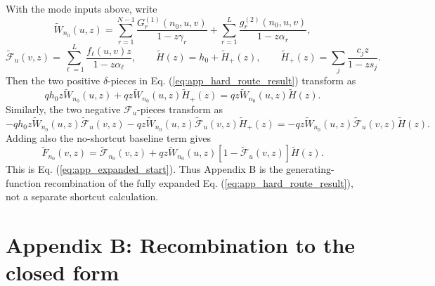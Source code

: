 \documentclass[superscriptaddress, amsmath, amssymb, aps, pre, floatfix]{revtex4-2}
\begin{document}
With the mode inputs above, write
\[
  \widetilde W_{n_0}(u,z)
  =
  \sum_{r=1}^{N-1}\frac{G^{(1)}_r(n_0,u,v)}{1-z\gamma_r}
  +
  \sum_{r=1}^{L}\frac{g^{(2)}_r(n_0,u,v)}{1-z\alpha_r},
\]
\[
  \widetilde{\mathcal F}_{u}(v,z)
  =
  \sum_{\ell=1}^{L}\frac{f_\ell(u,v)z}{1-z\alpha_\ell},
  \qquad
  \widetilde H(z)
  =
  h_0+\widetilde H_+(z),
  \qquad
  \widetilde H_+(z)=\sum_j\frac{c_jz}{1-zs_j}.
\]
Then the two positive \(\delta\)-pieces in Eq. (\ref{eq:app_hard_route_result}) transform as
\[
  qh_0z\widetilde W_{n_0}(u,z)
  +
  qz\widetilde W_{n_0}(u,z)\widetilde H_+(z)
  =
  qz\widetilde W_{n_0}(u,z)\widetilde H(z).
\]
Similarly, the two negative \(\mathcal F_u\)-pieces transform as
\[
  -qh_0z\widetilde W_{n_0}(u,z)\widetilde{\mathcal F}_{u}(v,z)
  -
  qz\widetilde W_{n_0}(u,z)\widetilde{\mathcal F}_{u}(v,z)\widetilde H_+(z)
  =
  -qz\widetilde W_{n_0}(u,z)\widetilde{\mathcal F}_{u}(v,z)\widetilde H(z).
\]
Adding also the no-shortcut baseline term gives
\[
  \widetilde F_{n_0}(v,z)
  =
  \widetilde{\mathcal F}_{n_0}(v,z)
  +
  qz\widetilde W_{n_0}(u,z)
  \left[1-\widetilde{\mathcal F}_{u}(v,z)\right]
  \widetilde H(z).
\]
This is Eq. (\ref{eq:app_expanded_start}).  Thus Appendix B is the generating-function recombination of the fully expanded Eq. (\ref{eq:app_hard_route_result}), not a separate shortcut calculation.

\section*{Appendix B: Recombination to the closed form}
\end{document}
